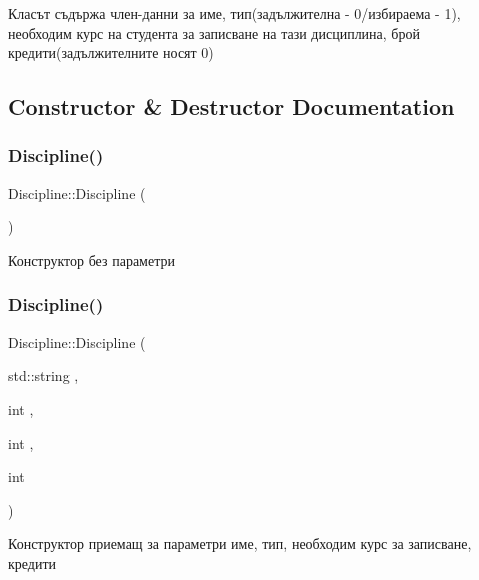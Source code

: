 Класът съдържа член-\/данни за име, тип(задължителна -\/ 0/избираема -\/ 1), необходим курс на студента за записване на тази дисциплина, брой кредити(задължителните носят 0) 

\subsection{Constructor \& Destructor Documentation}
\mbox{\label{class_discipline_a61b734e60c960dbda6ec72dc804a0b2b}} 
\subsubsection{\texorpdfstring{Discipline()}{Discipline()}\hspace{0.1cm}{\footnotesize\ttfamily [1/3]}}
{\footnotesize\ttfamily Discipline\+::\+Discipline (\begin{DoxyParamCaption}{ }\end{DoxyParamCaption})}



Конструктор без параметри 

\mbox{\label{class_discipline_a5f01ef5ac0cbaa3d4481ea4ad86c4688}} 
\subsubsection{\texorpdfstring{Discipline()}{Discipline()}\hspace{0.1cm}{\footnotesize\ttfamily [2/3]}}
{\footnotesize\ttfamily Discipline\+::\+Discipline (\begin{DoxyParamCaption}\item[{std\+::string}]{,  }\item[{int}]{,  }\item[{int}]{,  }\item[{int}]{ }\end{DoxyParamCaption})}



Конструктор приемащ за параметри име, тип, необходим курс за записване, кредити 

\mbox{\label{class_discipline_a5053a2810a87a20352ea5fc17a13dad5}} 
